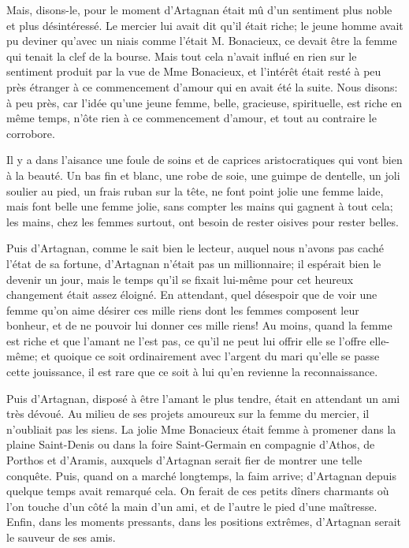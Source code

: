 Mais, disons-le, pour le moment d'Artagnan était mû d'un sentiment plus noble et plus désintéressé. Le mercier lui avait dit qu'il était riche; le jeune homme avait pu deviner qu'avec un niais comme l'était M. Bonacieux, ce devait être la femme qui tenait la clef de la bourse. Mais tout cela n'avait influé en rien sur le sentiment produit par la vue de Mme Bonacieux, et l'intérêt était resté à peu près étranger à ce commencement d'amour qui en avait été la suite. Nous disons: à peu près, car l'idée qu'une jeune femme, belle, gracieuse, spirituelle, est riche en même temps, n'ôte rien à ce commencement d'amour, et tout au contraire le corrobore. 

Il y a dans l'aisance une foule de soins et de caprices aristocratiques qui vont bien à la beauté. Un bas fin et blanc, une robe de soie, une guimpe de dentelle, un joli soulier au pied, un frais ruban sur la tête, ne font point jolie une femme laide, mais font belle une femme jolie, sans compter les mains qui gagnent à tout cela; les mains, chez les femmes surtout, ont besoin de rester oisives pour rester belles. 

Puis d'Artagnan, comme le sait bien le lecteur, auquel nous n'avons pas caché l'état de sa fortune, d'Artagnan n'était pas un millionnaire; il espérait bien le devenir un jour, mais le temps qu'il se fixait lui-même pour cet heureux changement était assez éloigné. En attendant, quel désespoir que de voir une femme qu'on aime désirer ces mille riens dont les femmes composent leur bonheur, et de ne pouvoir lui donner ces mille riens! Au moins, quand la femme est riche et que l'amant ne l'est pas, ce qu'il ne peut lui offrir elle se l'offre elle-même; et quoique ce soit ordinairement avec l'argent du mari qu'elle se passe cette jouissance, il est rare que ce soit à lui qu'en revienne la reconnaissance. 

Puis d'Artagnan, disposé à être l'amant le plus tendre, était en attendant un ami très dévoué. Au milieu de ses projets amoureux sur la femme du mercier, il n'oubliait pas les siens. La jolie Mme Bonacieux était femme à promener dans la plaine Saint-Denis ou dans la foire Saint-Germain en compagnie d'Athos, de Porthos et d'Aramis, auxquels d'Artagnan serait fier de montrer une telle conquête. Puis, quand on a marché longtemps, la faim arrive; d'Artagnan depuis quelque temps avait remarqué cela. On ferait de ces petits dîners charmants où l'on touche d'un côté la main d'un ami, et de l'autre le pied d'une maîtresse. Enfin, dans les moments pressants, dans les positions extrêmes, d'Artagnan serait le sauveur de ses amis. 

